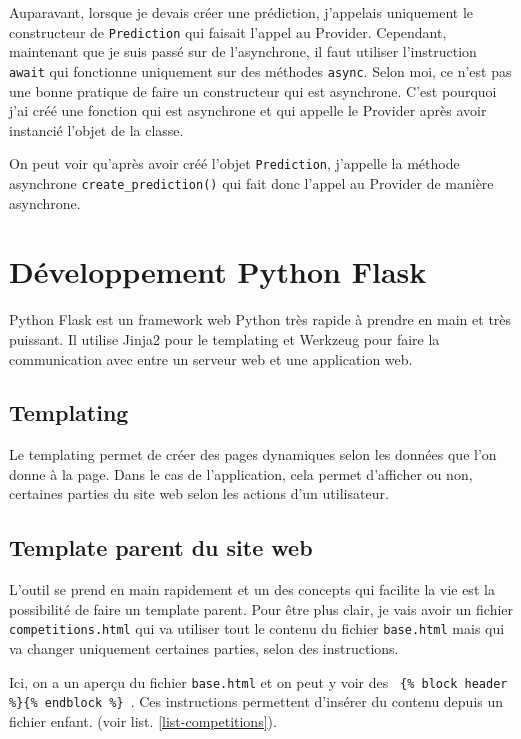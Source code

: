 \documentclass[a4paper,14pt]{extarticle}
\begin{document}
{Auparavant, lorsque je devais créer une prédiction, j'appelais uniquement le constructeur de \texttt{Prediction} qui faisait l'appel au Provider. Cependant, maintenant que je suis passé sur de l'asynchrone, il faut utiliser l'instruction \texttt{await} qui fonctionne uniquement sur des méthodes \texttt{async}. Selon moi, ce n'est pas une bonne pratique de faire un constructeur qui est asynchrone. C'est pourquoi j'ai créé une fonction qui est asynchrone et qui appelle le Provider après avoir instancié l'objet de la classe.


On peut voir qu'après avoir créé l'objet \texttt{Prediction}, j'appelle la méthode asynchrone \texttt{create\_prediction()} qui fait donc l'appel au Provider de manière asynchrone.

\newpage

\section{Développement Python Flask}

Python Flask est un framework web Python très rapide à prendre en main et très puissant. Il utilise Jinja2 pour le templating et Werkzeug pour faire la communication avec entre un serveur web et une application web. 

\subsection{Templating}

Le templating permet de créer des pages dynamiques selon les données que l'on donne à la page. Dans le cas de l'application, cela permet d'afficher ou non, certaines parties du site web selon les actions d'un utilisateur.

\subsection{Template parent du site web}

L'outil se prend en main rapidement et un des concepts qui facilite la vie est la possibilité de faire un template parent. Pour être plus clair, je vais avoir un fichier \texttt{competitions.html} qui va utiliser tout le contenu du fichier \texttt{base.html} mais qui va changer uniquement certaines parties, selon des instructions.

Ici, on a un aperçu du fichier \texttt{base.html} et on peut y voir des \texttt{ \{\% block header \%\}\{\% endblock \%\} }. Ces instructions permettent d'insérer du contenu depuis un fichier enfant. (voir list.  \ref{list-competitions}).

}
\end{document}

